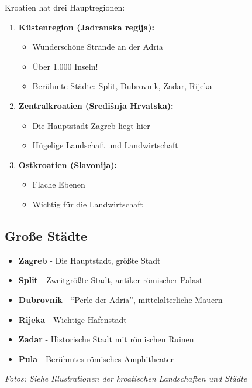 \begin{culture}
Kroatien hat drei Hauptregionen:

\begin{enumerate}
    \item \textbf{Küstenregion (Jadranska regija):} 
    \begin{itemize}
        \item Wunderschöne Strände an der Adria
        \item Über 1.000 Inseln!
        \item Berühmte Städte: Split, Dubrovnik, Zadar, Rijeka
    \end{itemize}
    
    \item \textbf{Zentralkroatien (Središnja Hrvatska):}
    \begin{itemize}
        \item Die Hauptstadt Zagreb liegt hier
        \item Hügelige Landschaft und Landwirtschaft
    \end{itemize}
    
    \item \textbf{Ostkroatien (Slavonija):}
    \begin{itemize}
        \item Flache Ebenen
        \item Wichtig für die Landwirtschaft
    \end{itemize}
\end{enumerate}

\subsection*{Große Städte}

\begin{itemize}
    \item \textbf{Zagreb} - Die Hauptstadt, größte Stadt
    \item \textbf{Split} - Zweitgrößte Stadt, antiker römischer Palast
    \item \textbf{Dubrovnik} - ``Perle der Adria'', mittelalterliche Mauern
    \item \textbf{Rijeka} - Wichtige Hafenstadt
    \item \textbf{Zadar} - Historische Stadt mit römischen Ruinen
    \item \textbf{Pula} - Berühmtes römisches Amphitheater
\end{itemize}

\textit{Fotos: Siehe Illustrationen der kroatischen Landschaften und Städte}
\end{culture}

